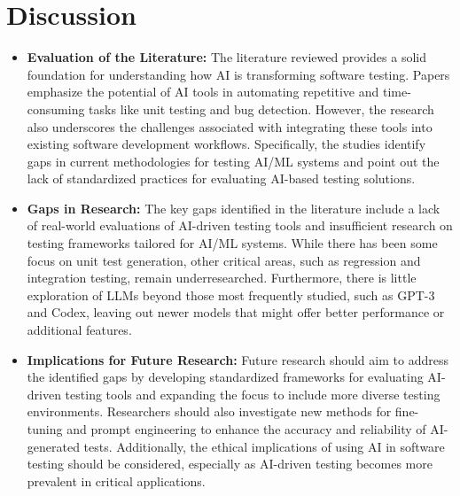 \documentclass[12pt,a4paper]{article}
\begin{document}
\newpage
\section{Discussion}
\begin{itemize}
    \item \textbf{Evaluation of the Literature:} The literature reviewed provides a solid foundation for understanding how AI is transforming software testing. Papers emphasize the potential of AI tools in automating repetitive and time-consuming tasks like unit testing and bug detection. However, the research also underscores the challenges associated with integrating these tools into existing software development workflows. Specifically, the studies identify gaps in current methodologies for testing AI/ML systems and point out the lack of standardized practices for evaluating AI-based testing solutions.
    
    \item \textbf{Gaps in Research:} The key gaps identified in the literature include a lack of real-world evaluations of AI-driven testing tools and insufficient research on testing frameworks tailored for AI/ML systems. While there has been some focus on unit test generation, other critical areas, such as regression and integration testing, remain underresearched. Furthermore, there is little exploration of LLMs beyond those most frequently studied, such as GPT-3 and Codex, leaving out newer models that might offer better performance or additional features.

    \item \textbf{Implications for Future Research:} Future research should aim to address the identified gaps by developing standardized frameworks for evaluating AI-driven testing tools and expanding the focus to include more diverse testing environments. Researchers should also investigate new methods for fine-tuning and prompt engineering to enhance the accuracy and reliability of AI-generated tests. Additionally, the ethical implications of using AI in software testing should be considered, especially as AI-driven testing becomes more prevalent in critical applications.

\end{itemize}

\end{document}
